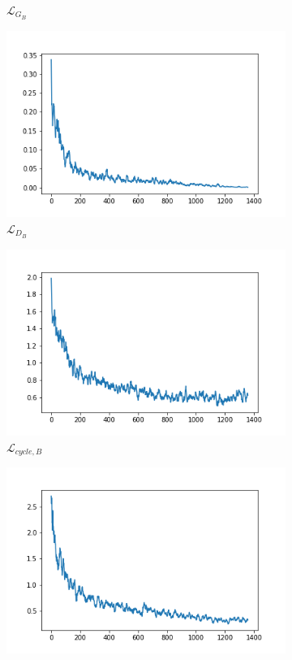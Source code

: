 \documentclass[twocolumn,11pt]{ctexart}
\begin{document}
\begin{figure}[htb]
\begin{subfigure}[b]{0.23\linewidth}
        \caption{$\mathcal{L}_{G_B}$}
      \end{subfigure}
      \begin{subfigure}[b]{0.23\linewidth}
        \includegraphics[width=\linewidth]{exp4_D_B.png}
        \caption{$\mathcal{L}_{D_B}$}
      \end{subfigure}
      \begin{subfigure}[b]{0.23\linewidth}
        \includegraphics[width=\linewidth]{exp4_cycle_B.png}
        \caption{$\mathcal{L}_{cycle,B}$}
      \end{subfigure}
      \begin{subfigure}[b]{0.23\linewidth}
        \includegraphics[width=\linewidth]{exp4_idt_B.png}

\end{subfigure}
\end{figure}
\end{document}
